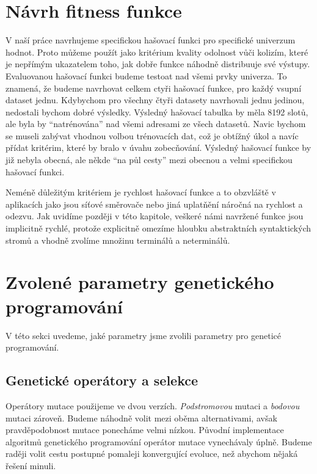 \section{Návrh fitness funkce}

V naší práce navrhujeme specifickou
hašovací funkci pro specifické univerzum hodnot. Proto můžeme použít jako kritérium
kvality odolnost vůči kolizím, které je nepřímým ukazatelem toho, jak dobře funkce
náhodně distribuuje své výstupy. Evaluovanou hašovací
funkci budeme testoat nad všemi prvky univerza. To znamená, že budeme navrhovat
celkem ctyři hašovací funkce, pro každý vsupní dataset jednu. Kdybychom pro všechny čtyři
datasety navrhovali jednu jedinou, nedostali bychom dobré výsledky. Výsledný hašovací tabulka
by měla 8192 slotů, ale byla by ``natrénována'' nad všemi adresami ze všech datasetů. Navic 
bychom se museli zabývat vhodnou volbou trénovacích dat, což je obtížný úkol a navíc přídat
kritérim, které by bralo v úvahu zobecňování. Výsledný hašovací funkce by již nebyla obecná, ale
někde ``na půl cesty'' mezi obecnou a velmi specifickou hašovací funkci.

Neméně důležitým kritériem je rychlost hašovací funkce a to obzvláště v aplikacích jako jsou
síťové směrovače nebo jiná uplatňění náročná na rychlost a odezvu. Jak uvidíme později v této
kapitole, veškeré námi navržené funkce jsou implicitně rychlé, protože explicitně omezíme hloubku
abstraktních syntaktických stromů a vhodně zvolíme množinu terminálů a neterminálů. 

\section{Zvolené parametry genetického programování}

V této sekci uvedeme, jaké parametry jsme zvolili parametry pro geneticé programování.

\subsection{Genetické operátory a selekce}

Operátory mutace použijeme ve dvou verzích. \textit{Podstromovou} mutaci a 
\textit{bodovou} mutaci zároveň. Budeme náhodně volit mezi oběma alternativami, 
avšak pravděpodobnost mutace ponecháme velmi nízkou. Původní implementace algoritmů
genetického programování \cite{GPTutorial} operátor mutace vynechávaly úplně. 
Budeme raději volit cestu postupné pomaleji konvergující evoluce, než abychom 
nějaká řešení minuli.

